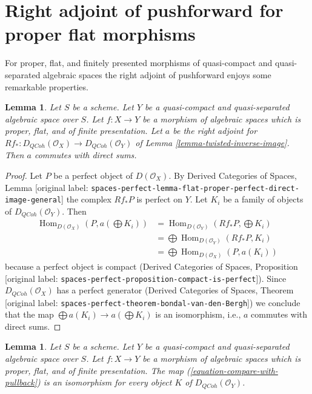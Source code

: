 \documentclass[10pt,a4paper]{article}
\theoremstyle{plain}
\newtheorem{lemma}[subsection]{Lemma}
\theoremstyle{definition}
\theoremstyle{remark}
\numberwithin{equation}{subsection}
\def\Hom{\mathop{\mathrm{Hom}}\nolimits}
\def\QCoh{\mathit{QCoh}}
\begin{document}
\section{Right adjoint of pushforward for proper flat morphisms}
\label{section-proper-flat}

\noindent
For proper, flat, and finitely presented morphisms of quasi-compact
and quasi-separated algebraic spaces the right adjoint of pushforward
enjoys some remarkable properties.

\begin{lemma}
\label{lemma-proper-flat}
Let $S$ be a scheme.
Let $Y$ be a quasi-compact and quasi-separated algebraic space over $S$.
Let $f : X \to Y$ be a morphism of algebraic spaces which is proper, flat, and
of finite presentation.
Let $a$ be the right adjoint for
$Rf_* : D_\QCoh(\mathcal{O}_X) \to D_\QCoh(\mathcal{O}_Y)$ of
Lemma \ref{lemma-twisted-inverse-image}. Then $a$ commutes with direct sums.
\end{lemma}

\begin{proof}
Let $P$ be a perfect object of $D(\mathcal{O}_X)$. By
Derived Categories of Spaces, Lemma
\textnormal{[original label: \nolinkurl{spaces-perfect-lemma-flat-proper-perfect-direct-image-general}]}
the complex $Rf_*P$ is perfect on $Y$.
Let $K_i$ be a family of objects of $D_\QCoh(\mathcal{O}_Y)$.
Then
\begin{align*}
\Hom_{D(\mathcal{O}_X)}(P, a(\bigoplus K_i))
& =
\Hom_{D(\mathcal{O}_Y)}(Rf_*P, \bigoplus K_i) \\
& =
\bigoplus \Hom_{D(\mathcal{O}_Y)}(Rf_*P, K_i) \\
& =
\bigoplus \Hom_{D(\mathcal{O}_X)}(P, a(K_i))
\end{align*}
because a perfect object is compact (Derived Categories of Spaces,
Proposition \textnormal{[original label: \nolinkurl{spaces-perfect-proposition-compact-is-perfect}]}).
Since $D_\QCoh(\mathcal{O}_X)$ has a perfect generator
(Derived Categories of Spaces, Theorem
\textnormal{[original label: \nolinkurl{spaces-perfect-theorem-bondal-van-den-Bergh}]})
we conclude that the map $\bigoplus a(K_i) \to a(\bigoplus K_i)$
is an isomorphism, i.e., $a$ commutes with direct sums.
\end{proof}

\begin{lemma}
\label{lemma-compare-with-pullback-flat-proper}
Let $S$ be a scheme.
Let $Y$ be a quasi-compact and quasi-separated algebraic space over $S$.
Let $f : X \to Y$ be a morphism of algebraic spaces which is proper, flat, and
of finite presentation.
The map (\ref{equation-compare-with-pullback}) is an isomorphism
for every object $K$ of $D_\QCoh(\mathcal{O}_Y)$.
\end{lemma}
\end{document}
